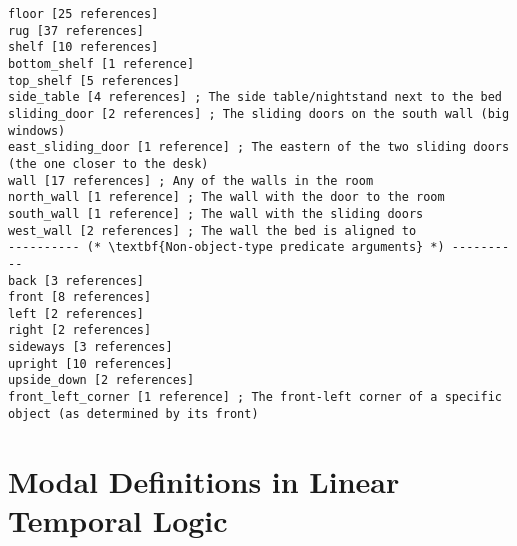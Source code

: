 \documentclass{article}
\begin{document}
\begin{lstlisting}
floor [25 references]
rug [37 references]
shelf [10 references]
bottom_shelf [1 reference]
top_shelf [5 references]
side_table [4 references] ; The side table/nightstand next to the bed
sliding_door [2 references] ; The sliding doors on the south wall (big windows)
east_sliding_door [1 reference] ; The eastern of the two sliding doors (the one closer to the desk)
wall [17 references] ; Any of the walls in the room
north_wall [1 reference] ; The wall with the door to the room
south_wall [1 reference] ; The wall with the sliding doors
west_wall [2 references] ; The wall the bed is aligned to
---------- (* \textbf{Non-object-type predicate arguments} *) ----------
back [3 references]
front [8 references]
left [2 references]
right [2 references]
sideways [3 references]
upright [10 references]
upside_down [2 references]
front_left_corner [1 reference] ; The front-left corner of a specific object (as determined by its front)
\end{lstlisting}




\section{Modal Definitions in Linear Temporal Logic}
\end{document}
